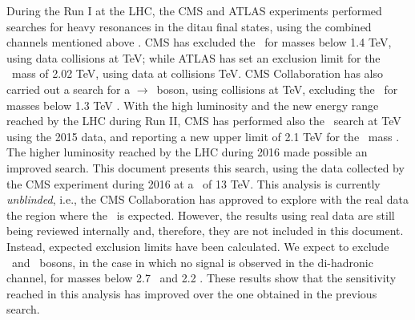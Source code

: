 
\noindent During the Run I at the LHC, the CMS and ATLAS experiments performed searches for heavy resonances 
in the ditau final states, using the combined channels mentioned above \cite{CMSZprimetotautaurun1,ATLASZprimetodileptonrun1}.
CMS has excluded the \ZprimeSSM~for masses below 1.4 TeV, using data collisions at  TeV; while ATLAS 
has set an exclusion limit for the \ZprimeSSM~mass of 2.02 TeV, using data at collisions  TeV. 
CMS Collaboration has also carried out a search for a \Zprime$\rightarrow$\taue\taumu~boson, using collisions at  TeV, excluding
the \ZprimeSSM~for masses below 1.3 TeV \cite{CMSZprimetotautauemu}. With the high luminosity and the new energy range 
reached by the LHC during Run II, CMS has performed also the \Zprimetotautau~search at  TeV using the 2015 data, and reporting 
a new upper limit of 2.1 TeV for the \ZprimeSSM~mass \cite{CMSZprimetotautau2015}. The higher luminosity reached 
by the LHC during 2016 made possible an improved search. This document presents this search, using 
the data collected by the CMS experiment during 2016 at a \centermassenergy~of 13 TeV. This analysis is currently \textit{unblinded}, i.e., the
CMS Collaboration has approved to explore with the 
real data the region where the \Zprimetotautau~is expected. However, the 
results using real data are still being reviewed internally and, therefore, they are 
not included in this document. Instead, expected exclusion 
limits have been calculated. We expect to exclude \ZprimeSSM~and \ZprimeTAT~bosons,
in the case in which no signal is observed in the di-hadronic channel, for 
masses below 2.7 \TeV~and 2.2 \TeV. These results show that 
the sensitivity reached in this analysis has improved over the one obtained in the previous
search.\\


